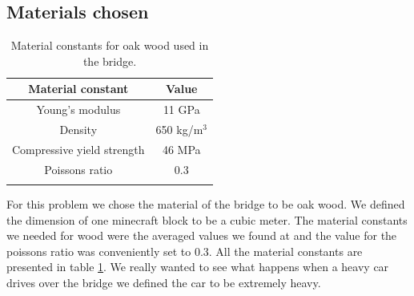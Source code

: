 \subsection{Materials chosen}
\begin{table}
\center
\caption{Material constants for oak wood used in the bridge.} 
\begin{tabular}{cc}
Material constant & Value \\ 
\hline 
Young's modulus & 11 GPa \\ 
Density & 650 kg/m$^3$ \\ 
Compressive yield strength & 46 MPa \\ 
Poissons ratio & 0.3 \\ 
\label{tab:oak}
\end{tabular}
\end{table}


For this problem we chose the material of the bridge to be oak wood. We defined the dimension of one minecraft block to be a cubic meter. The material constants we needed for wood were the averaged values we found at \cite{oak} and the value for the poissons ratio was conveniently set to 0.3. All the material constants are presented in table \ref{tab:oak}. We really wanted to see what happens when a heavy car drives over the bridge we defined the car to be extremely heavy.




